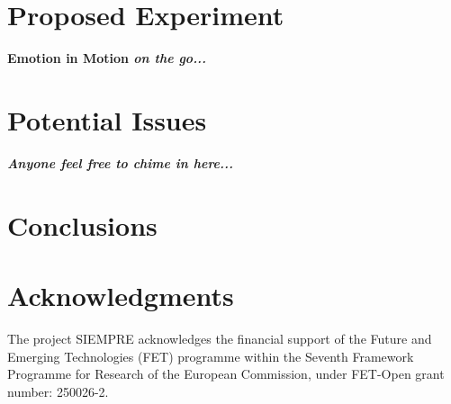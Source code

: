 \documentclass{sig-alternate}
\begin{document}
\section{Proposed Experiment}
\vspace{12pt}
\textbf{Emotion in Motion \textit{on the go...}}
\vspace{12pt}

\section{Potential Issues}
\vspace{12pt}
\textbf{\textit{Anyone feel free to chime in here...}}
\vspace{12pt}

\section{Conclusions}


\section{Acknowledgments}
The project SIEMPRE acknowledges the financial support of the Future and Emerging Technologies (FET) programme within the Seventh Framework Programme for Research of the European Commission, under FET-Open grant number: 250026-2.

%


%
%
\end{document}
